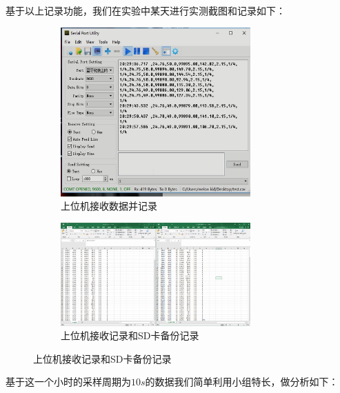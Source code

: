 \documentclass[a4paper, 11pt]{article} %
\begin{document}
基于以上记录功能，我们在实验中某天进行实测截图和记录如下：

\begin{figure}[H]
  \centering
  \begin{minipage}[H]{0.48\textwidth}
    \begin{figure}[H]
      \centering
      \includegraphics[width = 0.8\textwidth]{upmachine.png}
      \caption{上位机接收数据并记录}
    \end{figure}
  \end{minipage}
  \begin{minipage}[H]{0.48\textwidth}
    \begin{figure}[H]
      \centering
      \includegraphics[width = 0.8\textwidth]{upmachine_sd.png}
      \caption{上位机接收记录和SD卡备份记录}
    \end{figure}
  \end{minipage}
\end{figure}

基于这一个小时的采样周期为$10s$的数据我们简单利用小组特长，做分析如下：
\end{document}
